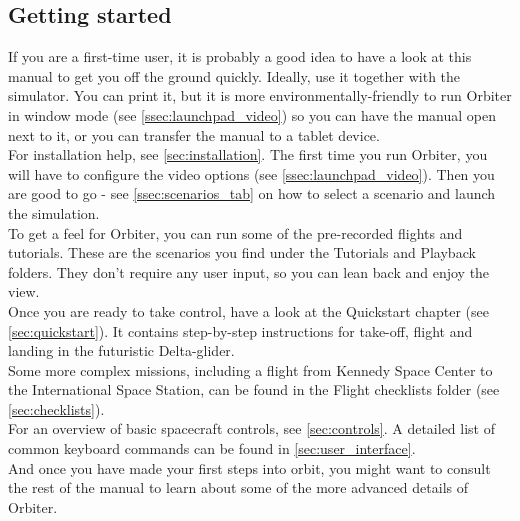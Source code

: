 \documentclass[Orbiter User Manual.tex]{subfiles}
\begin{document}
\subsection{Getting started}
If you are a first-time user, it is probably a good idea to have a look at this manual to get you off the ground quickly. Ideally, use it together with the simulator. You can print it, but it is more environmentally-friendly to run Orbiter in window mode (see \ref{ssec:launchpad_video}) so you can have the manual open next to it, or you can transfer the manual to a tablet device.\\
For installation help, see \ref{sec:installation}. The first time you run Orbiter, you will have to configure the video options (see \ref{ssec:launchpad_video}). Then you are good to go - see \ref{ssec:scenarios_tab} on how to select a scenario and launch the simulation.\\
To get a feel for Orbiter, you can run some of the pre-recorded flights and tutorials. These are the scenarios you find under the Tutorials and Playback folders. They don't require any user input, so you can lean back and enjoy the view.\\
Once you are ready to take control, have a look at the Quickstart chapter (see \ref{sec:quickstart}). It contains step-by-step instructions for take-off, flight and landing in the futuristic Delta-glider.\\
Some more complex missions, including a flight from Kennedy Space Center to the International Space Station, can be found in the Flight checklists folder (see \ref{sec:checklists}).\\
For an overview of basic spacecraft controls, see \ref{sec:controls}. A detailed list of common keyboard commands can be found in \ref{sec:user_interface}.\\
And once you have made your first steps into orbit, you might want to consult the rest of the manual to learn about some of the more advanced details of Orbiter.
\end{document}
